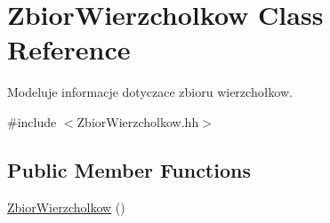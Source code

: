\hypertarget{class_zbior_wierzcholkow}{\section{Zbior\+Wierzcholkow Class Reference}
\label{class_zbior_wierzcholkow}
}


Modeluje informacje dotyczace zbioru wierzchołkow.  




{\ttfamily \#include $<$Zbior\+Wierzcholkow.\+hh$>$}

\subsection*{Public Member Functions}
\begin{DoxyCompactItemize}
\item 
\hypertarget{class_zbior_wierzcholkow_a702b749ebeb0ca56e2aa289164e2375a}{\hyperlink{class_zbior_wierzcholkow_a702b749ebeb0ca56e2aa289164e2375a}{Zbior\+Wierzcholkow} ()}\label{class_zbior_wierzcholkow_a702b749ebeb0ca56e2aa289164e2375a}


\end{DoxyCompactItemize}
